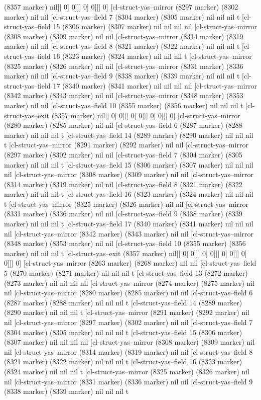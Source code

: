 {{(8357 marker) nil]] 0] 0]]] 0] 0]]] 0] [cl-struct-yas--mirror (8297 marker) (8302 marker) nil nil [cl-struct-yas--field 7 (8304 marker) (8305 marker) nil nil nil t [cl-struct-yas--field 15 (8306 marker) (8307 marker) nil nil nil nil [cl-struct-yas--mirror (8308 marker) (8309 marker) nil nil [cl-struct-yas--mirror (8314 marker) (8319 marker) nil nil [cl-struct-yas--field 8 (8321 marker) (8322 marker) nil nil nil t [cl-struct-yas--field 16 (8323 marker) (8324 marker) nil nil nil t [cl-struct-yas--mirror (8325 marker) (8326 marker) nil nil [cl-struct-yas--mirror (8331 marker) (8336 marker) nil nil [cl-struct-yas--field 9 (8338 marker) (8339 marker) nil nil nil t [cl-struct-yas--field 17 (8340 marker) (8341 marker) nil nil nil nil [cl-struct-yas--mirror (8342 marker) (8343 marker) nil nil [cl-struct-yas--mirror (8348 marker) (8353 marker) nil nil [cl-struct-yas--field 10 (8355 marker) (8356 marker) nil nil nil t [cl-struct-yas--exit (8357 marker) nil]] 0] 0]]] 0] 0]]] 0] 0]]] 0] [cl-struct-yas--mirror (8280 marker) (8285 marker) nil nil [cl-struct-yas--field 6 (8287 marker) (8288 marker) nil nil nil t [cl-struct-yas--field 14 (8289 marker) (8290 marker) nil nil nil t [cl-struct-yas--mirror (8291 marker) (8292 marker) nil nil [cl-struct-yas--mirror (8297 marker) (8302 marker) nil nil [cl-struct-yas--field 7 (8304 marker) (8305 marker) nil nil nil t [cl-struct-yas--field 15 (8306 marker) (8307 marker) nil nil nil nil [cl-struct-yas--mirror (8308 marker) (8309 marker) nil nil [cl-struct-yas--mirror (8314 marker) (8319 marker) nil nil [cl-struct-yas--field 8 (8321 marker) (8322 marker) nil nil nil t [cl-struct-yas--field 16 (8323 marker) (8324 marker) nil nil nil t [cl-struct-yas--mirror (8325 marker) (8326 marker) nil nil [cl-struct-yas--mirror (8331 marker) (8336 marker) nil nil [cl-struct-yas--field 9 (8338 marker) (8339 marker) nil nil nil t [cl-struct-yas--field 17 (8340 marker) (8341 marker) nil nil nil nil [cl-struct-yas--mirror (8342 marker) (8343 marker) nil nil [cl-struct-yas--mirror (8348 marker) (8353 marker) nil nil [cl-struct-yas--field 10 (8355 marker) (8356 marker) nil nil nil t [cl-struct-yas--exit (8357 marker) nil]] 0] 0]]] 0] 0]]] 0] 0]]] 0] 0]]] 0] [cl-struct-yas--mirror (8263 marker) (8268 marker) nil nil [cl-struct-yas--field 5 (8270 marker) (8271 marker) nil nil nil t [cl-struct-yas--field 13 (8272 marker) (8273 marker) nil nil nil nil [cl-struct-yas--mirror (8274 marker) (8275 marker) nil nil [cl-struct-yas--mirror (8280 marker) (8285 marker) nil nil [cl-struct-yas--field 6 (8287 marker) (8288 marker) nil nil nil t [cl-struct-yas--field 14 (8289 marker) (8290 marker) nil nil nil t [cl-struct-yas--mirror (8291 marker) (8292 marker) nil nil [cl-struct-yas--mirror (8297 marker) (8302 marker) nil nil [cl-struct-yas--field 7 (8304 marker) (8305 marker) nil nil nil t [cl-struct-yas--field 15 (8306 marker) (8307 marker) nil nil nil nil [cl-struct-yas--mirror (8308 marker) (8309 marker) nil nil [cl-struct-yas--mirror (8314 marker) (8319 marker) nil nil [cl-struct-yas--field 8 (8321 marker) (8322 marker) nil nil nil t [cl-struct-yas--field 16 (8323 marker) (8324 marker) nil nil nil t [cl-struct-yas--mirror (8325 marker) (8326 marker) nil nil [cl-struct-yas--mirror (8331 marker) (8336 marker) nil nil [cl-struct-yas--field 9 (8338 marker) (8339 marker) nil nil nil t }}
